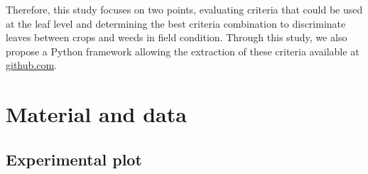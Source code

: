 \documentclass[../thesis.tex]{subfiles}
\begin{document}
    Therefore, this study focuses on two points, evaluating criteria that could be used at the leaf level and determining the best criteria combination to discriminate leaves between crops and weeds in field condition. Through this study, we also propose a Python framework allowing the extraction of these criteria available at \url{github.com}.
    
    
    
    
    \section{Material and data}
    
    \subsection{Experimental plot}
    
\end{document}
